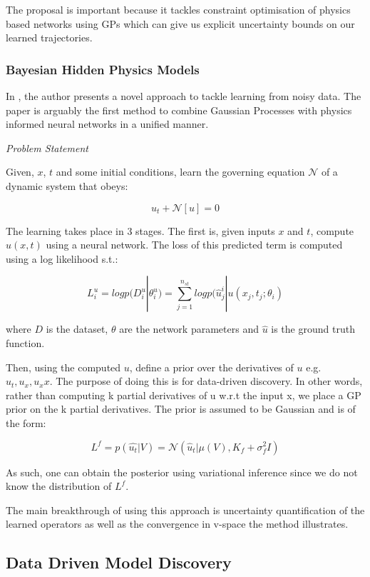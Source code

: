 \documentclass{article}
\begin{document}
The proposal is important because it tackles constraint optimisation of physics based networks using GPs which can give us explicit uncertainty bounds on our learned trajectories.


\subsubsection{Bayesian Hidden Physics Models}

In \cite{atkinson_bayesian_2020}, the author presents a novel approach to tackle learning from noisy data. The paper is arguably the first method to combine Gaussian Processes with physics informed neural networks in a unified manner.

\textit{Problem Statement}

Given, $x$, $t$ and some initial conditions, learn the governing equation $\mathcal{N}$ of a dynamic system that obeys:

$$ u_t + \mathcal{N}[u] = 0 $$

The learning takes place in 3 stages. The first is, given inputs $x$ and $t$, compute $u(x,t)$ using a neural network. The loss of this predicted term is computed using a log likelihood s.t.:

$$ L_i^u = log p(D_i^u|\theta_i^u) = \sum_{j=1}^{n_{st}} log p(\hat{u}_j^{i} | u(x_j,t_j;\theta_i) $$

where $D$ is the dataset, $\theta$ are the network parameters and $\hat{u}$ is the ground truth function.

Then, using the computed $u$, define a prior over the derivatives of $u$ e.g. $u_t,u_x,u_xx$. The purpose of doing this is for data-driven discovery. In other words, rather than computing k partial derivatives of u w.r.t the input x, we place a GP prior on the k partial derivatives. The prior is assumed to be Gaussian and is of the form:

$$ L^f = p(\hat{u_t}|V) = \mathcal{N} (\hat{u}_t|\mu(V),K_f +\sigma_f^2 I) $$

As such, one can obtain the posterior using variational inference since we do not know the distribution of $L^f$.

The main breakthrough of using this approach is uncertainty quantification of the learned operators as well as the convergence in v-space the method illustrates. 

\subsection{Data Driven Model Discovery}
\end{document}
